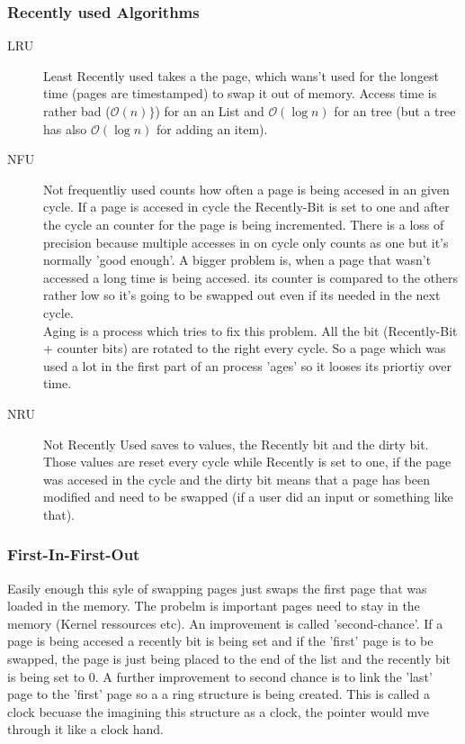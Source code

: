 \documentclass[a4paper]{scrartcl}
\begin{document}
                \subsubsection{Recently used Algorithms}
                \begin{description}
                    \item[LRU] Least Recently used takes a the page, which wans't used for the longest time (pages are timestamped) to swap it out of memory. Access time is rather bad (\(\mathcal{O}(n)\}\)) for an 
                    an List and \(\mathcal{O}(\log n)\) for an tree (but a tree has also \(\mathcal{O}(\log n)\) for adding an item).   
                    \item[NFU] Not frequentliy used counts how often a page is being accesed in an given cycle. If a page is accesed in cycle the Recently-Bit is set to one 
                        and after the cycle an counter for the page is being incremented. There is a loss of precision because multiple accesses in on cycle only counts as one but 
                        it's normally 'good enough'. A bigger problem is, when a page that wasn't accessed a long time is being accesed. its counter is compared to the others rather low
                        so it's going to be swapped out even if its needed in the next cycle. \\
                        Aging is a process which tries to fix this problem. All the bit (Recently-Bit + counter bits) are rotated to the right every cycle. So a page which was used a lot
                        in the first part of an process 'ages' so it looses its priortiy over time.
                    \item[NRU] Not Recently Used saves to values, the Recently bit and the dirty bit. Those values are reset every cycle while Recently is set to one, if the
                        page was accesed in the cycle and the dirty bit means that a page has been modified and need to be swapped (if a user did an input or something like that). 
                \end{description} 

                \subsubsection{First-In-First-Out}
                    Easily enough this syle of swapping  pages just swaps the first page that was loaded in the memory. The probelm is important pages need to stay in the
                    memory (Kernel ressources etc). An improvement is called 'second-chance'. If a page is being accesed a recently bit is being set and if the 
                    'first' page is to be swapped, the page is just being placed to the end of the list and the recently bit is being set to 0. A further improvement
                    to second chance is to link the 'last' page to the 'first' page so a a ring structure is being created. This is called a clock becuase the 
                    imagining this structure as a clock, the pointer would mve through it like a clock hand.
                
\end{document}
